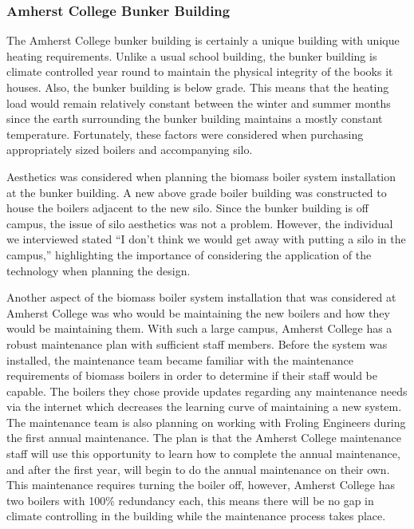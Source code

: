 \subsubsection{Amherst College Bunker Building}
\par The Amherst College bunker building is certainly a unique building with unique heating requirements. Unlike a usual school building, the bunker building is climate controlled year round to maintain the physical integrity of the books it houses. Also, the bunker building is below grade. This means that the heating load would remain relatively constant between the winter and summer months since the earth surrounding the bunker building maintains a mostly constant temperature. Fortunately, these factors were considered when purchasing appropriately sized boilers and accompanying silo.
\par Aesthetics was considered when planning the biomass boiler system installation at the bunker building. A new above grade boiler building was constructed to house the boilers adjacent to the new silo. Since the bunker building is off campus, the issue of silo aesthetics was not a problem. However, the individual we interviewed stated “I don’t think we would get away with putting a silo in the campus,” highlighting the importance of considering the application of the technology when planning the design.
\par Another aspect of the biomass boiler system installation that was considered at Amherst College was who would be maintaining the new boilers and how they would be maintaining them. With such a large campus, Amherst College has a robust maintenance plan with sufficient staff members. Before the system was installed, the maintenance team became familiar with the maintenance requirements of biomass boilers in order to determine if their staff would be capable. The boilers they chose provide updates regarding any maintenance needs via the internet which decreases the learning curve of maintaining a new system. The maintenance team is also planning on working with Froling Engineers during the first annual maintenance. The plan is that the Amherst College maintenance staff will use this opportunity to learn how to complete the annual maintenance, and after the first year, will begin to do the annual maintenance on their own. This maintenance requires turning the boiler off, however, Amherst College has two boilers with 100\% redundancy each, this means there will be no gap in climate controlling in the building while the maintenance process takes place.

